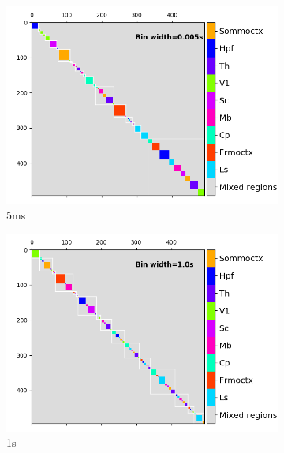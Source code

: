 \begin{figure}[p]
\begin{subfigure}[h]{0.5\linewidth}
      \includegraphics[width=\linewidth]{figures/eight_probe/Krebs_0p005_regional_cluster_map_total_absolute.png}
      \caption{5ms}
      \label{fig:absolute_regional_cluster_map_5ms}
    \end{subfigure}
    \begin{subfigure}[h]{0.5\linewidth}
      \includegraphics[width=\linewidth]{figures/eight_probe/Krebs_1p0_regional_cluster_map_total_absolute.png}
      \caption{1s}
      \label{fig:absolute_regional_cluster_map_1s}
    \end{subfigure}
    \begin{subfigure}[h]{0.5\linewidth}

\end{subfigure}
\end{figure}
